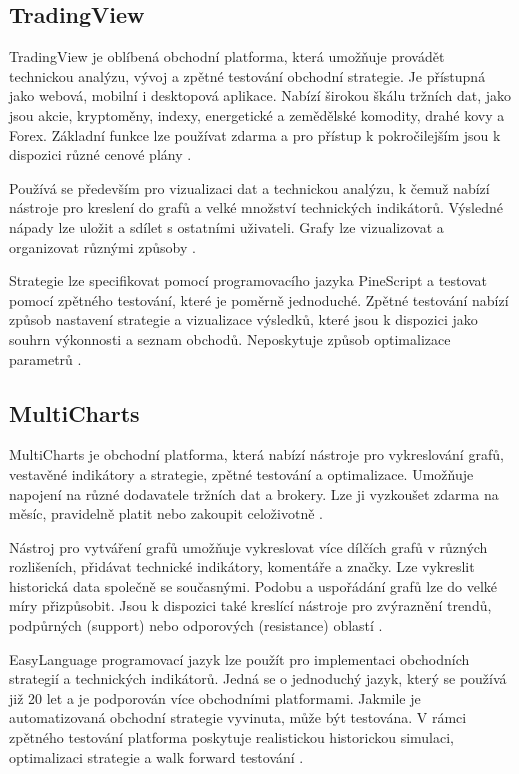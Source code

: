 \subsection{TradingView}
TradingView je oblíbená obchodní platforma, která umožňuje provádět technickou analýzu, vývoj a zpětné testování obchodní strategie.
Je přístupná jako webová, mobilní i desktopová aplikace. 
Nabízí širokou škálu tržních dat, jako jsou akcie, kryptoměny, indexy, energetické a zemědělské komodity, drahé kovy a Forex.
Základní funkce lze používat zdarma a pro přístup k pokročilejším jsou k dispozici různé cenové plány \cite{bowman}.

Používá se především pro vizualizaci dat a technickou analýzu, k čemuž nabízí nástroje pro kreslení do grafů a velké množství technických indikátorů.
Výsledné nápady lze uložit a sdílet s ostatními uživateli.
Grafy lze vizualizovat a organizovat různými způsoby \cite{tradingview}.

Strategie lze specifikovat pomocí programovacího jazyka PineScript a testovat pomocí zpětného testování, které je poměrně jednoduché.
Zpětné testování nabízí způsob nastavení strategie a vizualizace výsledků, které jsou k dispozici jako souhrn výkonnosti a seznam obchodů.
Neposkytuje způsob optimalizace parametrů \cite{tradingview}.

\subsection{MultiCharts}
MultiCharts je obchodní platforma, která nabízí nástroje pro vykreslování grafů, vestavěné indikátory a strategie, zpětné testování a optimalizace.
Umožňuje napojení na různé dodavatele tržních dat a brokery.
Lze ji vyzkoušet zdarma na měsíc, pravidelně platit nebo zakoupit celoživotně \cite{multicharts}.

Nástroj pro vytváření grafů umožňuje vykreslovat více dílčích grafů v různých rozlišeních, přidávat technické indikátory, komentáře a značky.
Lze vykreslit historická data společně se současnými.
Podobu a uspořádání grafů lze do velké míry přizpůsobit.
Jsou k dispozici také kreslící nástroje pro zvýraznění trendů, podpůrných (support) nebo odporových (resistance) oblastí \cite{multicharts}.

EasyLanguage programovací jazyk lze použít pro implementaci obchodních strategií a technických indikátorů.
Jedná se o jednoduchý jazyk, který se používá již 20 let a je podporován více obchodními platformami.
Jakmile je automatizovaná obchodní strategie vyvinuta, může být testována.
V rámci zpětného testování platforma poskytuje realistickou historickou simulaci, optimalizaci strategie a walk forward testování \cite{multicharts}.

